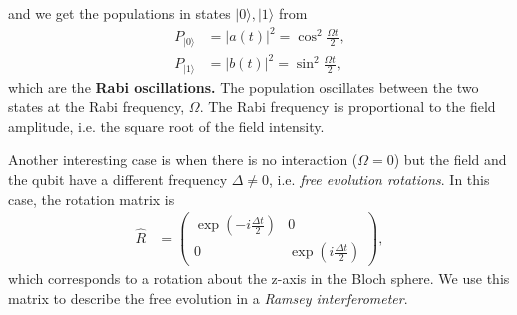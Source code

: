 \documentclass[lasers.tex]{subfiles}
\begin{document}
and we get the populations in states $|0\rangle,|1\rangle$ from
\begin{align}
    P_{|0\rangle} &= |a(t)|^2 = \cos^2\frac{\Omega t}{2},\\
    P_{|1\rangle} &= |b(t)|^2 = \sin^2\frac{\Omega t}{2},
\end{align}
which are the \textbf{Rabi oscillations.}
The population oscillates between the two states at the Rabi frequency, $\Omega$.
The Rabi frequency is proportional to the field amplitude, i.e. the square root of the field intensity. 
\begin{figure}[H]
    \centering
\end{figure}
Another interesting case is when there is no interaction ($\Omega=0$) but the field and the qubit have a different frequency $\Delta\neq0$, i.e. \emph{free evolution rotations}.
In this case, the rotation matrix is 
\begin{align}
    \hat{R} &= \begin{pmatrix} \exp\left(-i\frac{\Delta t}{2}\right) & 0 \\ 0 & \exp\left(i\frac{\Delta t}{2}\right)\end{pmatrix},
\end{align}
which corresponds to a rotation about the z-axis in the Bloch sphere. 
We use this matrix to describe the free evolution in a \emph{Ramsey interferometer}.
\end{document}
